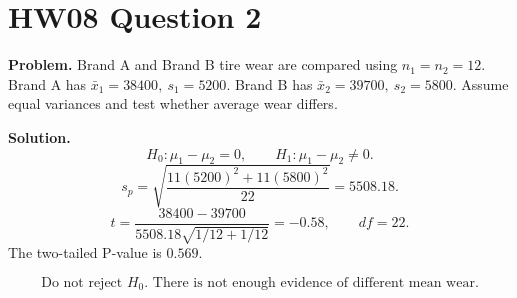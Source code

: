 \documentclass[11pt]{article}
\begin{document}
\section*{HW08 Question 2}

\textbf{Problem.} Brand A and Brand B tire wear are compared using \(n_1=n_2=12\). Brand A has \(\bar{x}_1=38400,\ s_1=5200\). Brand B has \(\bar{x}_2=39700,\ s_2=5800\). Assume equal variances and test whether average wear differs.

\textbf{Solution.}
\[
H_0:\mu_1-\mu_2=0,\qquad H_1:\mu_1-\mu_2\ne0.
\]
\[
s_p=\sqrt{\frac{11(5200)^2+11(5800)^2}{22}}=5508.18.
\]
\[
t=\frac{38400-39700}{5508.18\sqrt{1/12+1/12}}=-0.58,\qquad df=22.
\]
The two-tailed P-value is \(0.569\).

\[
\boxed{\text{Do not reject }H_0. \text{ There is not enough evidence of different mean wear.}}
\]
\end{document}
